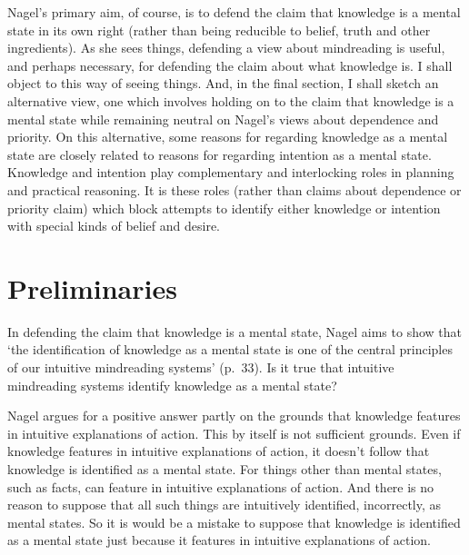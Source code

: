 \documentclass[11pt,a4paper]{extarticle}
\begin{document}
Nagel's primary aim, of course,
is to defend the claim that
knowledge is a mental state in its own right
(rather than being reducible to belief, truth and other ingredients).
As she sees things,
defending a view about mindreading
is useful, and perhaps necessary,
for defending the claim about what knowledge is.
I shall object to this way of seeing things.
And, in the final section, I shall sketch an alternative view,
one which involves holding on to the claim that knowledge is a mental state
while remaining neutral on Nagel's views about dependence and priority.
On this alternative,
some reasons for regarding knowledge as a mental state are 
closely related to
reasons for regarding intention as a mental state.
Knowledge and intention 
play complementary and interlocking roles in planning and practical reasoning.
It is these roles 
(rather than claims about dependence or priority claim)
which block attempts to identify either knowledge or intention with special kinds of belief and desire.




\section{Preliminaries}
In defending the claim that knowledge is a mental state, Nagel aims to show that `the identification of knowledge as a mental state is one of the central principles of our intuitive mindreading systems' (p.\ 33).
Is it true that intuitive mindreading systems identify knowledge as a mental state?

Nagel argues for a positive answer
partly on the grounds that 
knowledge features in intuitive explanations of action.
This by itself is not sufficient grounds.
Even if knowledge features in intuitive explanations of action, 
it doesn't follow that
knowledge is identified as a mental state.
For things other than mental states, such as facts, can feature in intuitive explanations of action.
And there is no reason to suppose that all such things are intuitively identified, incorrectly, as mental states.
So it is would be a mistake to suppose that knowledge is identified as a mental state just because it features in intuitive explanations of action.
\end{document}
